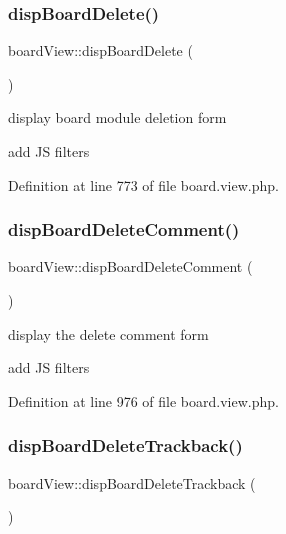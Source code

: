 \subsubsection{\texorpdfstring{disp\+Board\+Delete()}{dispBoardDelete()}}
{\footnotesize\ttfamily board\+View\+::disp\+Board\+Delete (\begin{DoxyParamCaption}{ }\end{DoxyParamCaption})}



display board module deletion form 

add JS filters

Definition at line 773 of file board.\+view.\+php.

\mbox{\label{classboardView_abb9180578737e27fe2bd16485ccf2df0}} 
\subsubsection{\texorpdfstring{disp\+Board\+Delete\+Comment()}{dispBoardDeleteComment()}}
{\footnotesize\ttfamily board\+View\+::disp\+Board\+Delete\+Comment (\begin{DoxyParamCaption}{ }\end{DoxyParamCaption})}



display the delete comment form 

add JS filters

Definition at line 976 of file board.\+view.\+php.

\mbox{\label{classboardView_aefd0c292301210361b441d848a42a7eb}} 
\subsubsection{\texorpdfstring{disp\+Board\+Delete\+Trackback()}{dispBoardDeleteTrackback()}}
{\footnotesize\ttfamily board\+View\+::disp\+Board\+Delete\+Trackback (\begin{DoxyParamCaption}{ }\end{DoxyParamCaption})}



